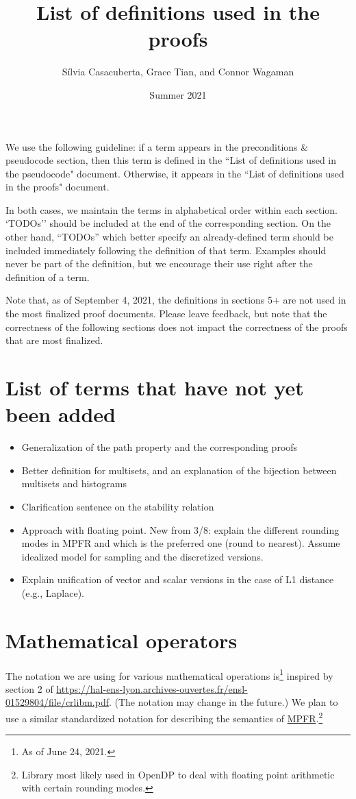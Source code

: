 \documentclass[11pt,a4paper]{article}
\title{List of definitions used in the proofs}
\author{S\'ilvia Casacuberta, Grace Tian, and Connor Wagaman}
\date{Summer 2021}
\theoremstyle{definition}
\begin{document}
\maketitle

We use the following guideline: if a term appears in the preconditions \& pseudocode section, then this term is defined in the ``List of definitions used in the pseudocode" document. Otherwise, it appears in the ``List of definitions used in the proofs" document. 

In both cases, we maintain the terms in alphabetical order within each section. `TODOs'' should be included at the end of the corresponding section. On the other hand, ``TODOs'' which better specify an already-defined term should be included immediately following the definition of that term. Examples should never be part of the definition, but we encourage their use right after the definition of a term.

Note that, as of September 4, 2021, the definitions in sections 5+ are not used in the most finalized proof documents. Please leave feedback, but note that the correctness of the following sections does not impact the correctness of the proofs that are most finalized.

\tableofcontents

\section*{List of terms that have not yet been added}
\begin{itemize}
\item Generalization of the path property and the corresponding proofs
\item Better definition for multisets, and an explanation of the bijection between multisets and histograms
\item Clarification sentence on the stability relation
\item Approach with floating point. New from 3/8: explain the different rounding modes in MPFR and which is the preferred one (round to nearest). Assume idealized model for sampling and the discretized versions.
\item Explain unification of vector and scalar versions in the case of L1 distance (e.g., Laplace).
\end{itemize}

\section{Mathematical operators}
The notation we are using for various mathematical operations is\footnote{As of June 24, 2021.} inspired by section 2 of \url{https://hal-ens-lyon.archives-ouvertes.fr/ensl-01529804/file/crlibm.pdf}. (The notation may change in the future.) We plan to use a similar standardized notation for describing the semantics of \href{https://www.mpfr.org/}{MPFR}.\footnote{Library most likely used in OpenDP to deal with floating point arithmetic with certain rounding modes.}
\end{document}
